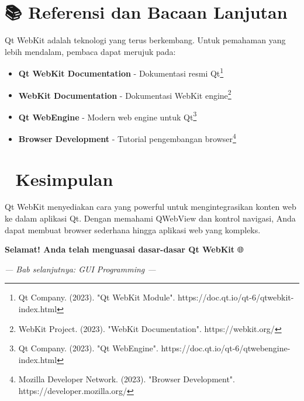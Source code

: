 \section{📚 Referensi dan Bacaan Lanjutan}

Qt WebKit adalah teknologi yang terus berkembang. Untuk pemahaman yang lebih mendalam, pembaca dapat merujuk pada:

\begin{itemize}
\item \textbf{Qt WebKit Documentation} - Dokumentasi resmi Qt\footnote{Qt Company. (2023). "Qt WebKit Module". https://doc.qt.io/qt-6/qtwebkit-index.html}
\item \textbf{WebKit Documentation} - Dokumentasi WebKit engine\footnote{WebKit Project. (2023). "WebKit Documentation". https://webkit.org/}
\item \textbf{Qt WebEngine} - Modern web engine untuk Qt\footnote{Qt Company. (2023). "Qt WebEngine". https://doc.qt.io/qt-6/qtwebengine-index.html}
\item \textbf{Browser Development} - Tutorial pengembangan browser\footnote{Mozilla Developer Network. (2023). "Browser Development". https://developer.mozilla.org/}
\end{itemize}

\section{🎉 Kesimpulan}

Qt WebKit menyediakan cara yang powerful untuk mengintegrasikan konten web ke dalam aplikasi Qt. Dengan memahami QWebView dan kontrol navigasi, Anda dapat membuat browser sederhana hingga aplikasi web yang kompleks.

\begin{center}
\textbf{Selamat! Anda telah menguasai dasar-dasar Qt WebKit} 🌐
\end{center}

\vspace{1cm}

\begin{center}
\textit{--- Bab selanjutnya: GUI Programming ---}
\end{center}
